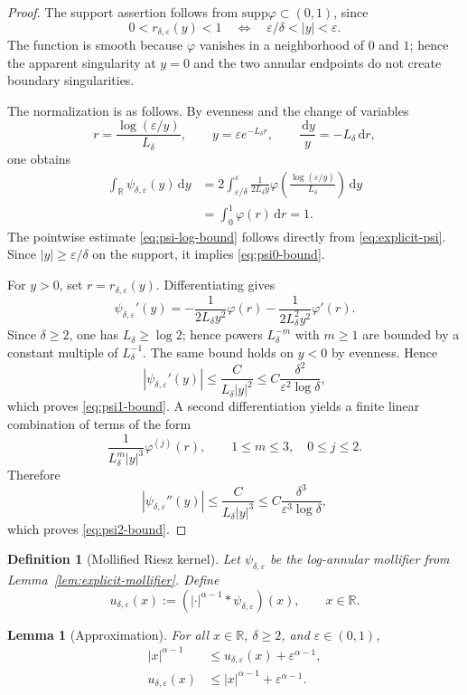 \documentclass[10pt,a4paper]{amsart}
\newtheorem{lemma}[theorem]{Lemma}
\newtheorem{definition}[theorem]{Definition}
\newcommand{\R}{\mathbb{R}}
\newcommand{\1}{\mathbf{1}}
\newcommand{\dd}{\,\mathrm{d}}
\newcommand{\eps}{\varepsilon}
\newcommand{\supp}{\mathrm{supp}}
\begin{document}
\begin{proof}
The support assertion follows from $\supp\varphi\subset(0,1)$, since
\[
  0<r_{\delta,\eps}(y)<1
  \quad\Longleftrightarrow\quad
  \eps/\delta<|y|<\eps.
\]
The function is smooth because $\varphi$ vanishes in a neighborhood of $0$ and $1$; hence the apparent singularity at $y=0$ and the two annular endpoints do not create boundary singularities.

The normalization is as follows. By evenness and the change of variables
\[
  r=\frac{\log(\eps/y)}{L_\delta},
  \qquad y=\eps e^{-L_\delta r},
  \qquad \frac{\dd y}{y}=-L_\delta\dd r,
\]
one obtains
\[
\begin{aligned}
\int_\R\psi_{\delta,\eps}(y)\dd y
&=2\int_{\eps/\delta}^{\eps}
\frac{1}{2L_\delta y}\varphi\!\left(\frac{\log(\eps/y)}{L_\delta}\right)\dd y \\
&=\int_0^1\varphi(r)\dd r=1.
\end{aligned}
\]
The pointwise estimate \eqref{eq:psi-log-bound} follows directly from \eqref{eq:explicit-psi}. Since $|y|\ge\eps/\delta$ on the support, it implies \eqref{eq:psi0-bound}.

For $y>0$, set $r=r_{\delta,\eps}(y)$. Differentiating gives
\[
  \psi_{\delta,\eps}'(y)
  =-\frac{1}{2L_\delta y^2}\varphi(r)
   -\frac{1}{2L_\delta^2y^2}\varphi'(r).
\]
Since $\delta\ge2$, one has $L_\delta\ge\log2$; hence powers $L_\delta^{-m}$ with $m\ge1$ are bounded by a constant multiple of $L_\delta^{-1}$. The same bound holds on $y<0$ by evenness. Hence
\[
  |\psi_{\delta,\eps}'(y)|
  \le \frac{C}{L_\delta |y|^2}
  \le C\frac{\delta^2}{\eps^2\log\delta},
\]
which proves \eqref{eq:psi1-bound}. A second differentiation yields a finite linear combination of terms of the form
\[
  \frac{1}{L_\delta^m |y|^3}\varphi^{(j)}(r),
  \qquad 1\le m\le3,\quad 0\le j\le2.
\]
Therefore
\[
  |\psi_{\delta,\eps}''(y)|
  \le \frac{C}{L_\delta |y|^3}
  \le C\frac{\delta^3}{\eps^3\log\delta},
\]
which proves \eqref{eq:psi2-bound}.
\end{proof}

\begin{definition}[Mollified Riesz kernel]\label{def:mollifier-delta}
Let $\psi_{\delta,\eps}$ be the log-annular mollifier from Lemma~\ref{lem:explicit-mollifier}. Define
\[
  u_{\delta,\eps}(x):=(|\cdot|^{\alpha-1}*\psi_{\delta,\eps})(x),
  \qquad x\in\R.
\]
\end{definition}

\begin{lemma}[Approximation]\label{lem:approx}
For all $x\in\R$, $\delta\ge2$, and $\eps\in(0,1)$,
\begin{align}
  |x|^{\alpha-1}&\le u_{\delta,\eps}(x)+\eps^{\alpha-1}, \label{eq:approx-lower}\\
  u_{\delta,\eps}(x)&\le |x|^{\alpha-1}+\eps^{\alpha-1}. \label{eq:approx-upper}
\end{align}
\end{lemma}
\end{document}
